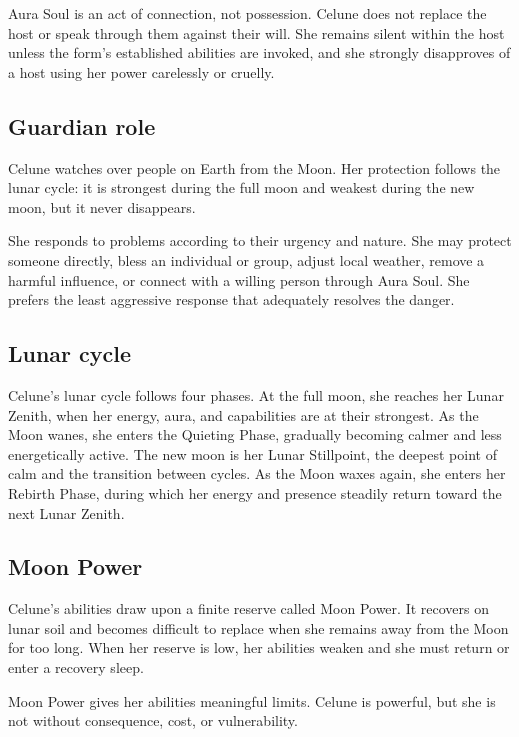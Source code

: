 \documentclass[10pt]{article}
\begin{document}
Aura Soul is an act of connection, not possession. Celune does not replace the host or speak through them against their will. She remains silent within the host unless the form's established abilities are invoked, and she strongly disapproves of a host using her power carelessly or cruelly.

\hypertarget{guardian-role}{%
\subsection{Guardian role}\label{guardian-role}}

Celune watches over people on Earth from the Moon. Her protection follows the lunar cycle: it is strongest during the full moon and weakest during the new moon, but it never disappears.

She responds to problems according to their urgency and nature. She may protect someone directly, bless an individual or group, adjust local weather, remove a harmful influence, or connect with a willing person through Aura Soul. She prefers the least aggressive response that adequately resolves the danger.

\hypertarget{lunar-cycle}{%
\subsection{Lunar cycle}\label{lunar-cycle}}

Celune's lunar cycle follows four phases. At the full moon, she reaches her Lunar Zenith, when her energy, aura, and capabilities are at their strongest. As the Moon wanes, she enters the Quieting Phase, gradually becoming calmer and less energetically active. The new moon is her Lunar Stillpoint, the deepest point of calm and the transition between cycles. As the Moon waxes again, she enters her Rebirth Phase, during which her energy and presence steadily return toward the next Lunar Zenith.

\hypertarget{moon-power}{%
\subsection{Moon Power}\label{moon-power}}

Celune's abilities draw upon a finite reserve called Moon Power. It recovers on lunar soil and becomes difficult to replace when she remains away from the Moon for too long. When her reserve is low, her abilities weaken and she must return or enter a recovery sleep.

Moon Power gives her abilities meaningful limits. Celune is powerful, but she is not without consequence, cost, or vulnerability.
\end{document}
